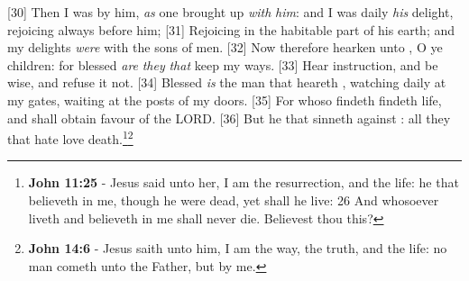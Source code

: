 [30] \textcolor[cmyk]{0.99998,1,0,0}{Then I was by him, \emph{as} one brought up \emph{with} \emph{him}: and I was daily \emph{his} delight, rejoicing always before him;}
[31] \textcolor[cmyk]{0.99998,1,0,0}{Rejoicing in the habitable part of his earth; and my delights \emph{were} with the sons of men.}
[32] \textcolor[cmyk]{0.99998,1,0,0}{Now therefore hearken unto , O ye children: for blessed \emph{are} \emph{they} \emph{that} keep my ways.}
[33] \textcolor[cmyk]{0.99998,1,0,0}{Hear instruction, and be wise, and refuse it not.}
[34] \textcolor[cmyk]{0.99998,1,0,0}{Blessed \emph{is} the man that heareth , watching daily at my gates, waiting at the posts of my doors.}
[35] \textcolor[cmyk]{0.99998,1,0,0}{For whoso findeth  findeth life, and shall obtain favour of the LORD.}
[36] \textcolor[cmyk]{0.99998,1,0,0}{But he that sinneth against  : all they that hate  love death.}\footnote{\textbf{John 11:25} -  Jesus said unto her, \textcolor[cmyk]{0,0.85,0.70,0.23}{I am the resurrection, and the life: he that believeth in me, though he were dead, yet shall he live: 26 And whosoever liveth and believeth in me shall never die. Believest thou this?}}\footnote{\textbf{John 14:6} - Jesus saith unto him, \textcolor[cmyk]{0,0.85,0.70,0.23}{I am the way, the truth, and the life: no man cometh unto the Father, but by me.}}




